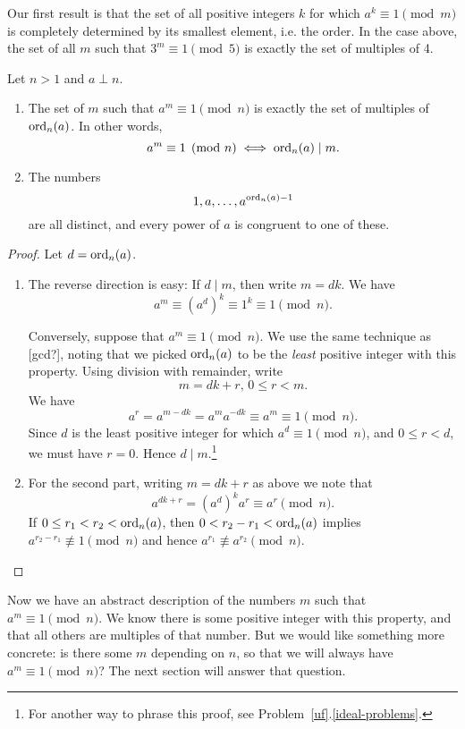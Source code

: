 Our first result is that the set
of all positive integers $k$ for which $a^k\equiv1\pmod{m}$ is
completely determined by its smallest element, i.e. the order. In the case above, the set of all $m$ such that $3^m\equiv 1\pmod{5}$ is exactly the set of multiples of 4.
\begin{pr}
\label{order-pid}
Let $n>1$ and $a\perp n$.
\begin{enumerate}
\item The set of $m$ such that $a^m\equiv 1\pmod{n}$ is exactly the set of multiples of $\operatorname{ord}_n(a)$. In other words, 
\[
a^m\equiv 1\pmod{n}\iff \operatorname{ord}_n(a)\mid m.
\]
\item The numbers
\[
1,a,\ldots, a^{\operatorname{ord}_n(a)-1}
\]
are all distinct, and every power of $a$ is congruent to one of these.
\end{enumerate}
\end{pr}
\begin{proof}
Let $d=\operatorname{ord}_n(a)$.
\begin{enumerate}
\item The reverse direction is easy: If $d\mid m$, then write $m=dk$. We have
\[
a^m\equiv (a^d)^k \equiv 1^k\equiv 1\pmod{n}.
\]

Conversely, suppose that $a^m\equiv 1\pmod{n}$. We use the same technique as [gcd?], noting that we picked $\operatorname{ord}_n(a)$ to be the {\it least} positive integer with this property. Using division with remainder, write
\[
m=dk+r,\,0\le r<m.
\]
We have
\[
a^r=a^{m-dk}=a^ma^{-dk}\equiv a^m\equiv 1\pmod{n}.
\]
Since $d$ is the least positive integer for which $a^d\equiv 1\pmod n$, and $0\le r<d$, we must have $r=0$. Hence $d\mid m$.\footnote{For another way to phrase this proof, see Problem~\ref{uf}.\ref{ideal-problems}.}
\item For the second part, writing $m=dk+r$ as above we note that 
\[
a^{dk+r}=(a^d)^ka^r\equiv a^r\pmod{n}.
\]
If $0\le r_1<r_2<\operatorname{ord}_n(a)$, then $0<r_2-r_1<\operatorname{ord}_n(a)$ implies $a^{r_2-r_1}\nequiv 1\pmod n$ and hence $a^{r_1}\nequiv a^{r_2}\pmod n$.\qedhere
\end{enumerate}
\end{proof}
Now we have an abstract description of the numbers $m$ such that $a^m\equiv 1\pmod{n}$. We know there is some positive integer with this property, and that all others are multiples of that number. 
But we would like something more concrete: is there some $m$ depending on $n$, so that we will always have $a^m\equiv 1\pmod{n}$? The next section will answer that question.
